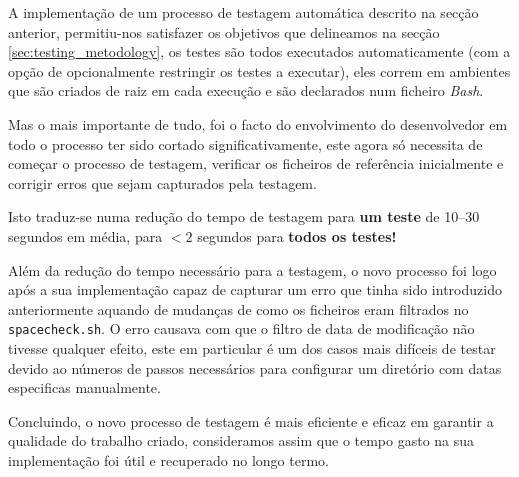 A implementação de um processo de testagem automática descrito na secção
anterior, permitiu-nos satisfazer os objetivos que delineamos na secção
\ref{sec:testing_metodology}, os testes são todos executados automaticamente (com a
opção de opcionalmente restringir os testes a executar), eles correm em
ambientes que são criados de raiz em cada execução e são declarados num ficheiro
\emph{Bash}.

Mas o mais importante de tudo, foi o facto do envolvimento do desenvolvedor
em todo o processo ter sido cortado significativamente, este agora só necessita
de começar o processo de testagem, verificar os ficheiros de referência
inicialmente e corrigir erros que sejam capturados pela testagem.

Isto traduz-se numa redução do tempo de testagem para \textbf{um teste} de
\numrange{10}{30} segundos em média, para $< 2$ segundos para
\textbf{todos os testes!}

Além da redução do tempo necessário para a testagem, o novo processo foi logo
após a sua implementação capaz de capturar um erro que tinha sido introduzido
anteriormente aquando de mudanças de como os ficheiros eram filtrados no
\Verb|spacecheck.sh|. O erro
causava com que o filtro de data de modificação não tivesse qualquer efeito,
este em particular é um dos casos mais difíceis de testar devido ao números de
passos necessários para configurar um diretório com datas especificas manualmente.

Concluindo, o novo processo de testagem é mais eficiente e eficaz em garantir
a qualidade do trabalho criado, consideramos assim que o tempo gasto na sua
implementação foi útil e recuperado no longo termo.
